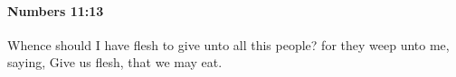 
		\paragraph{Numbers 11:13} %
			\label{NUMBERS-11-13}

			Whence should I have flesh to give unto all this people? for they weep unto me, saying, Give us flesh, that we may eat.



